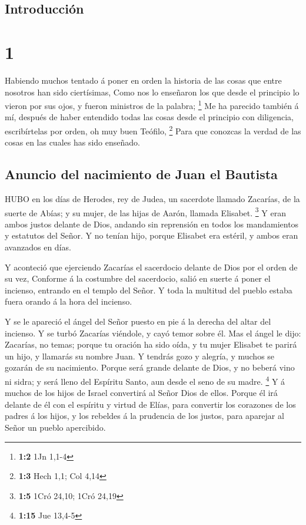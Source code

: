\hypertarget{introducciuxf3n}{%
\subsection{Introducción}\label{introducciuxf3n}}

\hypertarget{section}{%
\section{1}\label{section}}

 Habiendo muchos tentado á poner en orden la historia de
las cosas que entre nosotros han sido ciertísimas,  Como
nos lo enseñaron los que desde el principio lo vieron por sus ojos, y
fueron ministros de la palabra; \footnote{\textbf{1:2} 1Jn 1,1-4}
 Me ha parecido también á mí, después de haber entendido
todas las cosas desde el principio con diligencia, escribírtelas por
orden, oh muy buen Teófilo, \footnote{\textbf{1:3} Hech 1,1; Col 4,14}
 Para que conozcas la verdad de las cosas en las cuales
has sido enseñado.

\hypertarget{anuncio-del-nacimiento-de-juan-el-bautista}{%
\subsection{Anuncio del nacimiento de Juan el
Bautista}\label{anuncio-del-nacimiento-de-juan-el-bautista}}

 HUBO en los días de Herodes, rey de Judea, un sacerdote
llamado Zacarías, de la suerte de Abías; y su mujer, de las hijas de
Aarón, llamada Elisabet. \footnote{\textbf{1:5} 1Cró 24,10; 1Cró 24,19}
 Y eran ambos justos delante de Dios, andando sin
reprensión en todos los mandamientos y estatutos del Señor.
 Y no tenían hijo, porque Elisabet era estéril, y ambos
eran avanzados en días.

 Y aconteció que ejerciendo Zacarías el sacerdocio delante
de Dios por el orden de su vez,  Conforme á la costumbre
del sacerdocio, salió en suerte á poner el incienso, entrando en el
templo del Señor.  Y toda la multitud del pueblo estaba
fuera orando á la hora del incienso.

 Y se le apareció el ángel del Señor puesto en pie á la
derecha del altar del incienso.  Y se turbó Zacarías
viéndole, y cayó temor sobre él.  Mas el ángel le dijo:
Zacarías, no temas; porque tu oración ha sido oída, y tu mujer Elisabet
te parirá un hijo, y llamarás su nombre Juan.  Y tendrás
gozo y alegría, y muchos se gozarán de su nacimiento. 
Porque será grande delante de Dios, y no beberá vino ni sidra; y será
lleno del Espíritu Santo, aun desde el seno de su madre. \footnote{\textbf{1:15}
  Jue 13,4-5}  Y á muchos de los hijos de Israel
convertirá al Señor Dios de ellos.  Porque él irá delante
de él con el espíritu y virtud de Elías, para convertir los corazones de
los padres á los hijos, y los rebeldes á la prudencia de los justos,
para aparejar al Señor un pueblo apercibido.

